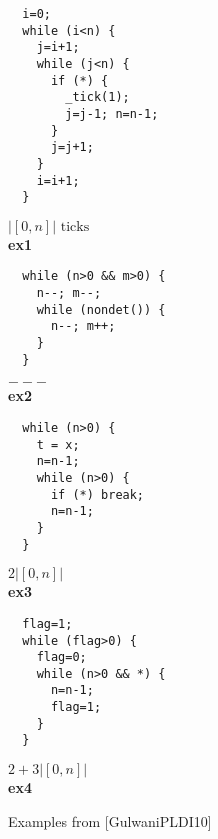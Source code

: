 \documentclass[nocopyrightspace,preprint]{sigplanconf}
\begin{document}
\begin{figure*}[t!]
 \setlength{\progwidth}{.24\linewidth}
  \centering
%
%
  \begin{minipage}[b]{\progwidth}
    \begin{center}
   \begin{lstlisting}
  i=0;
  while (i<n) {
    j=i+1;
    while (j<n) {
      if (*) {
        _tick(1);
        j=j-1; n=n-1;
      }
      j=j+1;
    }
    i=i+1;
  }
   \end{lstlisting}
$|[0, n]| \text{ ticks}$
\\[.7\baselineskip]
      {\bf ex1}
    \end{center}
  \end{minipage}
%
%
  \begin{minipage}[b]{\progwidth}
    \begin{center}
   \begin{lstlisting}
  while (n>0 && m>0) {
    n--; m--;
    while (nondet()) {
      n--; m++;
    }
  }
   \end{lstlisting}
$---$
\\[.7\baselineskip]
      {\bf ex2}
    \end{center}
  \end{minipage}
%
%
  \begin{minipage}[b]{\progwidth}
    \begin{center}
   \begin{lstlisting}
  while (n>0) {
    t = x;
    n=n-1;
    while (n>0) {
      if (*) break;
      n=n-1;
    }
  }
   \end{lstlisting}
$2 |[0, n]|$
\\[.7\baselineskip]
      {\bf ex3}
    \end{center}
  \end{minipage}
%
%
  \begin{minipage}[b]{\progwidth}
    \begin{center}
   \begin{lstlisting}
  flag=1;
  while (flag>0) {
    flag=0;
    while (n>0 && *) {
      n=n-1;       
      flag=1;
    }
  }
   \end{lstlisting}
$2 + 3|[0, n]|$
\\[.7\baselineskip]
      {\bf ex4}
    \end{center}
  \end{minipage}


   \caption{Examples from [GulwaniPLDI10]}
  \label{fig:cat3a}
\end{figure*}
\end{document}
